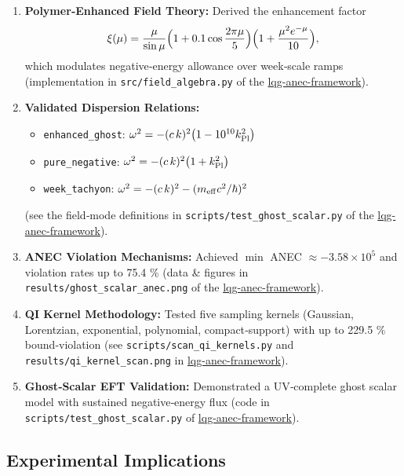 \documentclass[11pt]{article}
\begin{document}
\begin{enumerate}[label=\arabic*.]
\item \textbf{Polymer‐Enhanced Field Theory:}  
  Derived the enhancement factor  
  \[
    \xi(\mu)
    = \frac{\mu}{\sin\mu}
      \Bigl(1 + 0.1\cos\frac{2\pi\mu}{5}\Bigr)
      \Bigl(1 + \frac{\mu^2 e^{-\mu}}{10}\Bigr),
  \]
  which modulates negative‐energy allowance over week‐scale ramps  
  (implementation in \texttt{src/field_algebra.py} of the
  \href{https://github.com/arcticoder/lqg-anec-framework}{lqg-anec-framework}).  

  \item \textbf{Validated Dispersion Relations:}
    \begin{itemize}[nosep]
      \item \texttt{enhanced\_ghost}: \(\omega^2 = -(c\,k)^2\bigl(1 - 10^{10}k_{\rm Pl}^2\bigr)\)  
      \item \texttt{pure\_negative}: \(\omega^2 = -(c\,k)^2\bigl(1 + k_{\rm Pl}^2\bigr)\)  
      \item \texttt{week\_tachyon}: \(\omega^2 = -(c\,k)^2 - (m_{\rm eff}c^2/\hbar)^2\)  
    \end{itemize}
    (see the field‐mode definitions in
    \texttt{scripts/test\_ghost\_scalar.py} of the
    \href{https://github.com/arcticoder/lqg-anec-framework}{lqg-anec-framework}).  

  \item \textbf{ANEC Violation Mechanisms:}
    Achieved \(\min\) ANEC \(\approx -3.58\times10^5\) and violation rates up to 75.4 \%  
    (data \& figures in \texttt{results/ghost\_scalar\_anec.png} of the
    \href{https://github.com/arcticoder/lqg-anec-framework}{lqg-anec-framework}).  

  \item \textbf{QI Kernel Methodology:}
    Tested five sampling kernels (Gaussian, Lorentzian, exponential,
    polynomial, compact‐support) with up to 229.5 \% bound‐violation  
    (see \texttt{scripts/scan\_qi\_kernels.py} and
    \texttt{results/qi\_kernel\_scan.png} in
    \href{https://github.com/arcticoder/lqg-anec-framework}{lqg-anec-framework}).  

  \item \textbf{Ghost‐Scalar EFT Validation:}
    Demonstrated a UV‐complete ghost scalar model with sustained negative‐energy flux  
    (code in \texttt{scripts/test\_ghost\_scalar.py} of
    \href{https://github.com/arcticoder/lqg-anec-framework}{lqg-anec-framework}).
\end{enumerate}

\subsection*{Experimental Implications}
\end{document}
